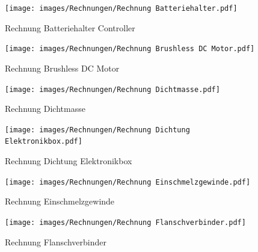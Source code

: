 \documentclass[a4paper,12pt]{article}
\begin{document}
\begin{figure}[H]
    \centering
    \begin{minipage}[b]{0.42\linewidth}
        \centering
        \texttt{[image: images/Rechnungen/Rechnung Batteriehalter.pdf]}
        \caption{Rechnung Batteriehalter Controller}
        \label{fig:Batteriehalter Controller}
    \end{minipage}
    \hspace{2.5em}  
    \begin{minipage}[b]{0.42\linewidth}
        \centering
        \texttt{[image: images/Rechnungen/Rechnung Brushless DC Motor.pdf]}
        \caption{Rechnung Brushless DC Motor}
        \label{fig:Rechnung Brushless DC Motor}
    \end{minipage}
\end{figure}


\begin{figure}[H]
    \centering
    \begin{minipage}[b]{0.44\linewidth}
        \centering
        \texttt{[image: images/Rechnungen/Rechnung Dichtmasse.pdf]}
        \caption{Rechnung Dichtmasse}
        \label{fig:Rechnung Dichtmasse}
    \end{minipage}
    \hspace{2.5em}  
    \begin{minipage}[b]{0.42\linewidth}
        \centering
        \texttt{[image: images/Rechnungen/Rechnung Dichtung Elektronikbox.pdf]}
        \caption{Rechnung Dichtung Elektronikbox}
        \label{fig:Rechnung Dichtung Elektronikbox}
    \end{minipage}
\end{figure}


\begin{figure}[H]
    \centering
    \begin{minipage}[b]{0.42\linewidth}
        \centering
        \texttt{[image: images/Rechnungen/Rechnung Einschmelzgewinde.pdf]}
        \caption{Rechnung Einschmelzgewinde}
        \label{fig:Rechnung Einschmelzgewinde}
    \end{minipage}
    \hspace{2.5em}  
    \begin{minipage}[b]{0.42\linewidth}
        \centering
        \texttt{[image: images/Rechnungen/Rechnung Flanschverbinder.pdf]}
        \caption{Rechnung Flanschverbinder}
        \label{fig:Rechnung Flanschverbinder}
    \end{minipage}
\end{figure}
\end{document}
